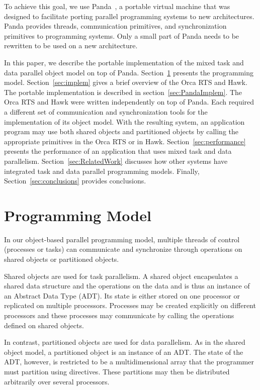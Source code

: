 \documentclass{article}
\begin{document}
To achieve this goal, we use Panda~\cite{bhoedjang93}, a portable
virtual machine that was designed to facilitate porting parallel
programming systems to new architectures. Panda provides threads,
communication primitives, and synchronization primitives to
programming systems. Only a small part of Panda needs to be rewritten
to be used on a new architecture.

In this paper, we describe the portable implementation of the mixed
task and data parallel object model on top of Panda.
Section~\ref{sec:model} presents the programming model.
Section~\ref{sec:implem} gives a brief overview of the Orca RTS and
Hawk. The portable implementation is described in
section~\ref{sec:PandaImplem}. The Orca RTS and Hawk were written
independently on top of Panda. Each required a different set of
communication and synchronization tools for the implementation of its
object model. With the resulting system, an application program may
use both shared objects and partitioned objects by calling the
appropriate primitives in the Orca RTS or in Hawk.
Section~\ref{sec:performance} presents the performance of an
application that uses mixed task and data parallelism.
Section~\ref{sec:RelatedWork} discusses how other systems have
integrated task and data parallel programming models. Finally,
Section~\ref{sec:conclusions} provides conclusions.

\pagestyle{empty}
\thispagestyle{empty}


\section{Programming Model}
\label{sec:model}

In our object-based parallel programming model, multiple threads of
control (processes or tasks) can communicate and synchronize through
operations on shared objects or partitioned objects.

Shared objects are used for task parallelism. A shared object
encapsulates a shared data structure and the operations on the data
and is thus an instance of an Abstract Data Type (ADT). Its state is
either stored on one processor or replicated on multiple processors.
Processes may be created explicitly on different processors and these
processes may communicate by calling the operations defined on shared
objects.

In contrast, partitioned objects are used for data parallelism. As in
the shared object model, a partitioned object is an instance of an
ADT. The state of the ADT, however, is restricted to be a
multidimensional array that the programmer must partition using
directives. These partitions may then be distributed arbitrarily over
several processors.
\end{document}
